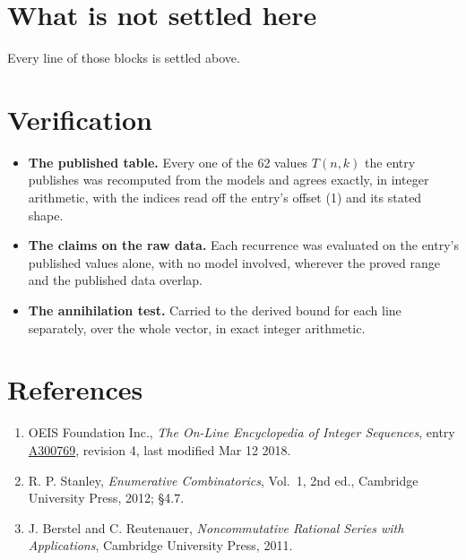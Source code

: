 \documentclass[11pt]{article}
\theoremstyle{definition}
\begin{document}
\section{What is not settled here}

Every line of those blocks is settled above.

\section{Verification}

\begin{itemize}

\item {\bfseries The published table.} Every one of the 62 values $T(n,k)$ the entry publishes was recomputed from the models and agrees exactly, in integer arithmetic, with the indices read off the entry's offset (1) and its stated shape.

\item {\bfseries The claims on the raw data.} Each recurrence was evaluated on the entry's published values alone, with no model involved, wherever the proved range and the published data overlap.

\item {\bfseries The annihilation test.} Carried to the derived bound for each line separately, over the whole vector, in exact integer arithmetic.

\end{itemize}

\section{References}

\begin{enumerate}

\item OEIS Foundation Inc., \emph{The On-Line Encyclopedia of Integer Sequences}, entry \href{https://oeis.org/A300769}{A300769}, revision 4, last modified Mar 12 2018.

\item R. P. Stanley, \emph{Enumerative Combinatorics}, Vol.~1, 2nd ed., Cambridge University Press, 2012; \S4.7.

\item J. Berstel and C. Reutenauer, \emph{Noncommutative Rational Series with Applications}, Cambridge University Press, 2011.

\end{enumerate}
\end{document}
